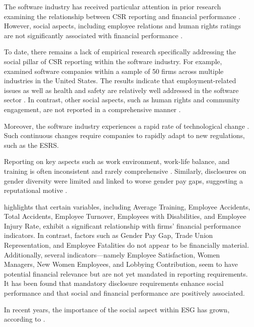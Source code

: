The software industry has received particular attention in prior research examining the relationship 
between CSR reporting and financial performance \parencite{Okafor2021}.
However, social aspects, including employee relations and human rights ratings are not significantly associated 
with financial performance \parencite{Okafor2021}.

To date, there remains a lack of empirical research specifically addressing the social pillar of CSR reporting 
within the software industry. For example, \textcite{Holder-Webb2009} examined software companies within a sample 
of 50 firms across multiple industries in the United States. The results indicate that employment-related issues 
as well as health and safety are relatively well addressed in the software sector \parencite{Holder-Webb2009}. 
In contrast, other social aspects, such as human rights and community engagement, are not reported in a 
comprehensive manner \parencite{Holder-Webb2009}.

Moreover, the software industry experiences a rapid rate of technological change \parencite{Li2010}.
Such continuous changes require companies to rapidly adapt to new regulations, such as the ESRS. 

Reporting on key aspects such as work environment, work-life balance, 
and training is often inconsistent and rarely comprehensive \parencite{Greig2021}. Similarly,
disclosures on gender diversity were limited and linked to worse gender pay gaps,
suggesting a reputational motive \parencite{Huang2022}.

\textcite{Bornar2025} highlights that certain variables, including Average Training, Employee Accidents, 
Total Accidents, Employee Turnover, Employees with Disabilities, and Employee Injury Rate, exhibit 
a significant relationship with firms' financial performance indicators. In contrast, factors such as Gender Pay Gap, 
Trade Union Representation, and Employee Fatalities do not appear to be financially material. Additionally, 
several indicators—namely Employee Satisfaction, Women Managers, New Women Employees, and Lobbying Contribution, 
seem to have potential financial relevance but are not yet mandated in reporting requirements.
It has been found that mandatory disclosure requirements enhance social performance and that social 
and financial performance are positively associated.

In recent years, the importance of the social aspect within ESG has grown, according to \textcite{BaidJayaraman2022}. 

